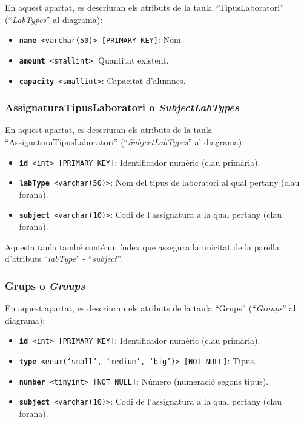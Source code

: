 \documentclass[a4paper,12pt]{ThesisStyle}
\begin{document}
En aquest apartat, es descriuran els atributs de la taula ``TipusLaboratori'' (``\textit{LabTypes}'' al diagrama):
\begin{itemize}
  \item \texttt{\textbf{name} <varchar(50)> [PRIMARY KEY]}: Nom.
  \item \texttt{\textbf{amount} <smallint>}: Quantitat existent.
  \item \texttt{\textbf{capacity} <smallint>}: Capacitat d'alumnes.
\end{itemize}

\subsubsection{AssignaturaTipusLaboratori o \textit{SubjectLabTypes}}

En aquest apartat, es descriuran els atributs de la taula ``AssignaturaTipusLaboratori'' (``\textit{SubjectLabTypes}'' al diagrama):
\begin{itemize}
  \item \texttt{\textbf{id} <int> [PRIMARY KEY]}: Identificador numèric (clau primària).
  \item \texttt{\textbf{labType} <varchar(50)>}: Nom del tipus de laboratori al qual pertany (clau forana).
  \item \texttt{\textbf{subject} <varchar(10)>}: Codi de l'assignatura a la qual pertany (clau forana).
\end{itemize}

Aquesta taula també conté un índex que assegura la unicitat de la parella d'atributs ``\textit{labType}'' - ``\textit{subject}''.

\subsubsection{Grups o \textit{Groups}}

En aquest apartat, es descriuran els atributs de la taula ``Grups'' (``\textit{Groups}'' al diagrama):
\begin{itemize}
  \item \texttt{\textbf{id} <int> [PRIMARY KEY]}: Identificador numèric (clau primària).
  \item \texttt{\textbf{type} <enum(`small', `medium', `big')> [NOT NULL]}: Tipus.
  \item \texttt{\textbf{number} <tinyint> [NOT NULL]}: Número (numeració segons tipus).
  \item \texttt{\textbf{subject} <varchar(10)>}: Codi de l'assignatura a la qual pertany (clau forana).
\end{itemize}
\end{document}
